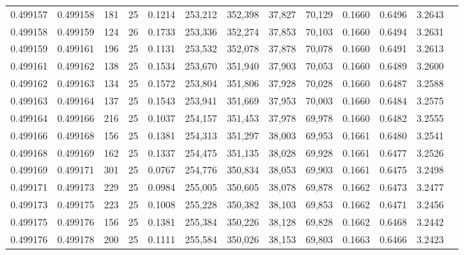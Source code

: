 \begin{tabular}{rrrrrrrrrrrrr}
0.499157 & 0.499158 & 181 &  25 &                                     0.1214 & 253,212 & 352,398 &  37,827 &  70,129 & 0.1660 & 0.6496 & 3.2643 \\
0.499158 & 0.499159 & 124 &  26 &                                     0.1733 & 253,336 & 352,274 &  37,853 &  70,103 & 0.1660 & 0.6494 & 3.2631 \\
0.499159 & 0.499161 & 196 &  25 &                                     0.1131 & 253,532 & 352,078 &  37,878 &  70,078 & 0.1660 & 0.6491 & 3.2613 \\
0.499161 & 0.499162 & 138 &  25 &                                     0.1534 & 253,670 & 351,940 &  37,903 &  70,053 & 0.1660 & 0.6489 & 3.2600 \\
0.499162 & 0.499163 & 134 &  25 &                                     0.1572 & 253,804 & 351,806 &  37,928 &  70,028 & 0.1660 & 0.6487 & 3.2588 \\
0.499163 & 0.499164 & 137 &  25 &                                     0.1543 & 253,941 & 351,669 &  37,953 &  70,003 & 0.1660 & 0.6484 & 3.2575 \\
0.499164 & 0.499166 & 216 &  25 &                                     0.1037 & 254,157 & 351,453 &  37,978 &  69,978 & 0.1660 & 0.6482 & 3.2555 \\
0.499166 & 0.499168 & 156 &  25 &                                     0.1381 & 254,313 & 351,297 &  38,003 &  69,953 & 0.1661 & 0.6480 & 3.2541 \\
0.499168 & 0.499169 & 162 &  25 &                                     0.1337 & 254,475 & 351,135 &  38,028 &  69,928 & 0.1661 & 0.6477 & 3.2526 \\
0.499169 & 0.499171 & 301 &  25 &                                     0.0767 & 254,776 & 350,834 &  38,053 &  69,903 & 0.1661 & 0.6475 & 3.2498 \\
0.499171 & 0.499173 & 229 &  25 &                                     0.0984 & 255,005 & 350,605 &  38,078 &  69,878 & 0.1662 & 0.6473 & 3.2477 \\
0.499173 & 0.499175 & 223 &  25 &                                     0.1008 & 255,228 & 350,382 &  38,103 &  69,853 & 0.1662 & 0.6471 & 3.2456 \\
0.499175 & 0.499176 & 156 &  25 &                                     0.1381 & 255,384 & 350,226 &  38,128 &  69,828 & 0.1662 & 0.6468 & 3.2442 \\
0.499176 & 0.499178 & 200 &  25 &                                     0.1111 & 255,584 & 350,026 &  38,153 &  69,803 & 0.1663 & 0.6466 & 3.2423 \\

\end{tabular}
